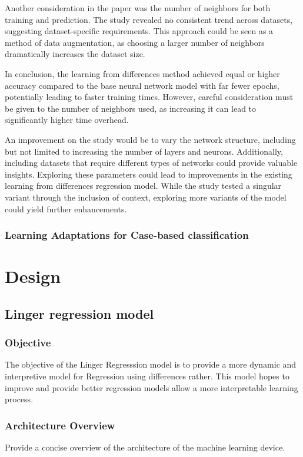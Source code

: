 \documentclass[a4paper, 12pt]{report}
\begin{document}
Another consideration in the paper \cite{learningFromDifferences2022} was the number of neighbors for both training and prediction. 
The study revealed no consistent trend across datasets, suggesting dataset-specific requirements. 
This approach could be seen as a method of data augmentation, as choosing a larger number of neighbors dramatically increases the dataset size.

In conclusion, the learning from differences method achieved equal or higher accuracy compared to the base neural network model with far fewer epochs, 
potentially leading to faster training times. However, careful consideration must be given to the number of neighbors used, as increasing it can lead to significantly higher time overhead.

An improvement on the study \cite{learningFromDifferences2022} would be to vary the network structure, including but not limited to increasing the number of layers and neurons. 
Additionally, including datasets that require different types of networks could provide valuable insights. 
Exploring these parameters could lead to improvements in the existing learning from differences regression model. 
While the study tested a singular variant through the inclusion of context, exploring more variants of the model could yield further enhancements.
\subsection{Learning Adaptations for Case-based classification}

\chapter{Design}
\label{ch:Design}
\section{Linger regression model}
\subsection{Objective}
The objective of the Linger Regresssion model is to provide a more dynamic and interpretive model for Regression using differences rather. This model hopes to improve 
and provide better regression models allow a more interpretable learning process.

\subsection{Architecture Overview}
Provide a concise overview of the architecture of the machine learning device.
\end{document}
